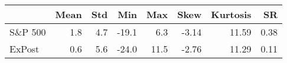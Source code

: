 \begin{tabular}{lrrrrrrr}
\hline
         &   Mean &   Std &   Min &   Max &   Skew &   Kurtosis &   SR \\
\hline
 S\&P 500 &    1.8 &   4.7 & -19.1 &   6.3 &  -3.14 &      11.59 & 0.38 \\
 ExPost  &    0.6 &   5.6 & -24.0 &  11.5 &  -2.76 &      11.29 & 0.11 \\
\hline
\end{tabular}